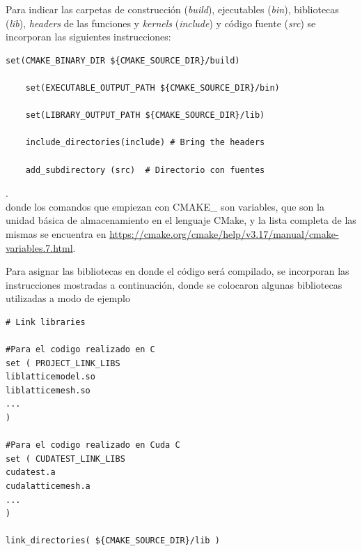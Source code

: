 Para indicar las carpetas de construcción (\textit{build}), ejecutables (\textit{bin}), bibliotecas (\textit{lib}), \textit{headers} de las funciones y \textit{kernels} (\textit{include}) y código fuente (\textit{src}) se incorporan las siguientes instrucciones:

{\footnotesize
	\begin{frame}{}
		\begin{lstlisting}[frame=single]
	set(CMAKE_BINARY_DIR ${CMAKE_SOURCE_DIR}/build)

	set(EXECUTABLE_OUTPUT_PATH ${CMAKE_SOURCE_DIR}/bin)

	set(LIBRARY_OUTPUT_PATH ${CMAKE_SOURCE_DIR}/lib)

	include_directories(include) # Bring the headers
	
	add_subdirectory (src) 	# Directorio con fuentes

		\end{lstlisting}
		
	\end{frame}
}.
\\
donde los comandos que empiezan con \textsc{CMAKE\_} son variables, que son la unidad básica de almacenamiento en el lenguaje CMake, y la lista completa de las mismas se encuentra en \url{https://cmake.org/cmake/help/v3.17/manual/cmake-variables.7.html}.


Para asignar las bibliotecas en donde el código será compilado, se incorporan las instrucciones mostradas a continuación, donde se colocaron algunas bibliotecas utilizadas a modo de ejemplo
{\footnotesize
	\begin{frame}{}
		\begin{lstlisting}[frame=single]
# Link libraries

#Para el codigo realizado en C
set ( PROJECT_LINK_LIBS 
liblatticemodel.so 		
liblatticemesh.so
...
)

#Para el codigo realizado en Cuda C
set ( CUDATEST_LINK_LIBS 
cudatest.a
cudalatticemesh.a
...
)

link_directories( ${CMAKE_SOURCE_DIR}/lib )
		
		\end{lstlisting}
		
	\end{frame}
}

